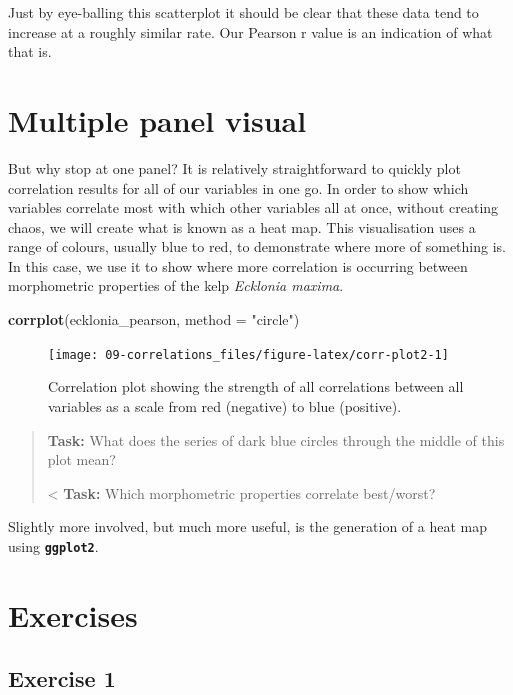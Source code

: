 \documentclass[english,10pt,a4paper,oneside]{book}
\newenvironment{Shaded}{\begin{snugshade}}{\end{snugshade}}
\newcommand{\KeywordTok}[1]{\textcolor[rgb]{0.13,0.29,0.53}{\textbf{#1}}}
\newcommand{\DataTypeTok}[1]{\textcolor[rgb]{0.13,0.29,0.53}{#1}}
\newcommand{\StringTok}[1]{\textcolor[rgb]{0.31,0.60,0.02}{#1}}
\newcommand{\NormalTok}[1]{#1}
\theoremstyle{definition}
\theoremstyle{definition}
\theoremstyle{definition}
\theoremstyle{remark}
\begin{document}
Just by eye-balling this scatterplot it should be clear that these data
tend to increase at a roughly similar rate. Our Pearson r value is an
indication of what that is.

\section{Multiple panel visual}\label{multiple-panel-visual}

But why stop at one panel? It is relatively straightforward to quickly
plot correlation results for all of our variables in one go. In order to
show which variables correlate most with which other variables all at
once, without creating chaos, we will create what is known as a heat
map. This visualisation uses a range of colours, usually blue to red, to
demonstrate where more of something is. In this case, we use it to show
where more correlation is occurring between morphometric properties of
the kelp \emph{Ecklonia maxima}.

\begin{Shaded}
\begin{Highlighting}[]
\KeywordTok{corrplot}\NormalTok{(ecklonia_pearson, }\DataTypeTok{method =} \StringTok{"circle"}\NormalTok{)}
\end{Highlighting}
\end{Shaded}

\begin{figure}
\texttt{[image: 09-correlations\_files/figure-latex/corr-plot2-1]} \caption{Correlation plot showing the strength of all correlations between all variables as a scale from red (negative) to blue (positive).}\label{fig:corr-plot2}
\end{figure}

\begin{quote}
\textbf{Task:} What does the series of dark blue circles through the
middle of this plot mean?

\textless{} \textbf{Task:} Which morphometric properties correlate
best/worst?
\end{quote}

Slightly more involved, but much more useful, is the generation of a
heat map using \textbf{\texttt{ggplot2}}.

\section{Exercises}\label{exercises-5}

\subsection{Exercise 1}\label{exercise-1-5}
\end{document}
